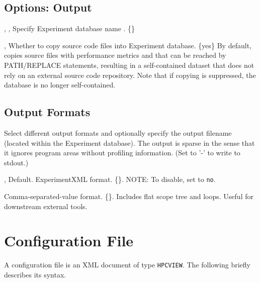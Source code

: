 \documentclass[english]{article}
\begin{document}
\subsection{Options: Output}

\begin{Description}
  \item[\OptArg{-o}{db-path}, \OptArg{--db}{db-path}, \OptArg{--output}{db-path}] Specify Experiment database name .  \{\}
  \item[\OptoArg{--src}{yes \Bar\ no}, \OptoArg{--source}{yes \Bar\ no}] Whether to copy source code files into Experiment database. \{yes\} By default,  copies source files with performance metrics and that can be reached by PATH/REPLACE statements, resulting in a self-contained dataset that does not rely on an external source code repository.  Note that if copying is suppressed, the database is no longer self-contained.
\end{Description}

\subsection{Output Formats}

Select different output formats and optionally specify the output filename  (located within the Experiment database). The output is sparse in the sense that it ignores program areas without profiling information. (Set  to '-' to write to stdout.)

\begin{Description}
  \item[\OptoArg{-x}{file}, \OptoArg{--experiment}{file}] Default.  ExperimentXML format. \{\}.  NOTE: To disable, set  to \verb+no+.
  \item[\OptoArg{--csv}{file}] Comma-separated-value format. \{\}. Includes flat scope tree and loops.  Useful for downstream external tools.
\end{Description}

\section{Configuration File}

A  configuration file is an XML document of type \texttt{HPCVIEW}.
The following briefly describes its syntax.
\end{document}

